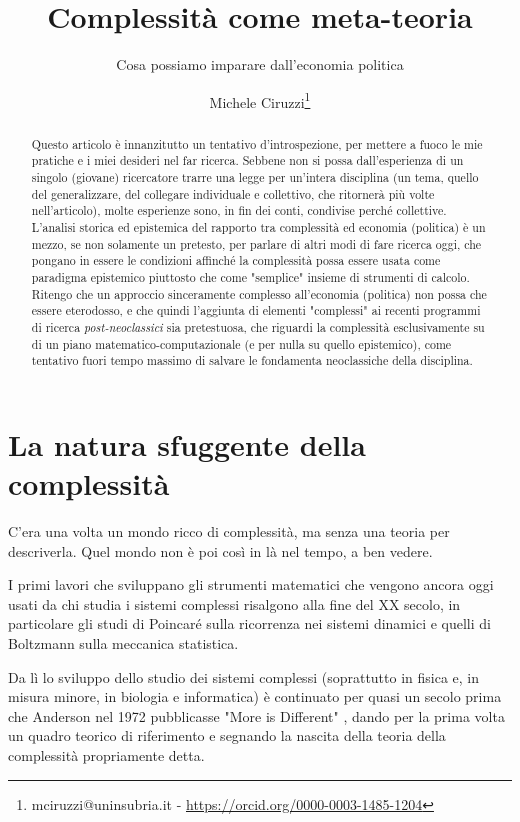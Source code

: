 \documentclass[a4paper, headings=standardclasses]{scrartcl}
\title{Complessità come meta-teoria\let\thefootnote\relax\footnotetext{
		Questa versione è un lavoro preparatiorio per un articolo da presentare alla 2023 INEM Conference. \\
		È a sua volta basata su un precedente lavoro presentato alla 24esima ESHET Summer School. \\
		L'ultima versione disponibile di questo lavoro, insieme a una più concisa versione in inglese, è disponibile online \url{https://github.com/TnTo/complexity-economics/}.
}}
\subtitle{Cosa possiamo imparare dall'economia politica}
\author{Michele Ciruzzi\thanks{mciruzzi@uninsubria.it - \url{https://orcid.org/0000-0003-1485-1204}}}
\begin{document}
\maketitle

\begin{abstract}
	Questo articolo è innanzitutto un tentativo d'introspezione, per mettere a fuoco le mie pratiche e i miei desideri nel far ricerca.
	Sebbene non si possa dall'esperienza di un singolo (giovane) ricercatore trarre una legge per un'intera disciplina (un tema, quello del generalizzare, del collegare individuale e collettivo, che ritornerà più volte nell'articolo), molte esperienze sono, in fin dei conti, condivise perché collettive.
	L'analisi storica ed epistemica del rapporto tra complessità ed economia (politica) è un mezzo, se non solamente un pretesto, per parlare di altri modi di fare ricerca oggi, che pongano in essere le condizioni affinché la complessità possa essere usata come paradigma epistemico piuttosto che come "semplice" insieme di strumenti di calcolo.
	Ritengo che un approccio sinceramente complesso all'economia (politica) non possa che essere eterodosso, e che quindi l'aggiunta di elementi "complessi" ai recenti programmi di ricerca \textit{post-neoclassici} sia pretestuosa, che riguardi la complessità esclusivamente su di un piano matematico-computazionale (e per nulla su quello epistemico), come tentativo fuori tempo massimo di salvare le fondamenta neoclassiche della disciplina.
\end{abstract}

\section{La natura sfuggente della complessità}
C'era una volta un mondo ricco di complessità, ma senza una teoria per descriverla. Quel mondo non è poi così in là nel tempo, a ben vedere.

I primi lavori che sviluppano gli strumenti matematici che vengono ancora oggi usati da chi studia i sistemi complessi risalgono alla fine del XX secolo, in particolare gli studi di Poincaré sulla ricorrenza nei sistemi dinamici e quelli di Boltzmann sulla meccanica statistica.

Da lì lo sviluppo dello studio dei sistemi complessi (soprattutto in fisica e, in misura minore, in biologia e informatica) è continuato per quasi un secolo prima che Anderson nel 1972 pubblicasse "More is Different" \parencite{anderson1972}, dando per la prima volta un quadro teorico di riferimento e segnando la nascita della teoria della complessità propriamente detta.
\end{document}

